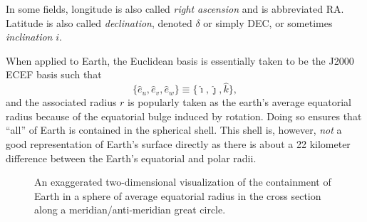 \documentclass[11pt,dvipsnames]{thesis}
\begin{document}
In some fields, longitude is also called \textit{right ascension} and is abbreviated RA. Latitude is also called \textit{declination}, denoted $\delta$ or simply DEC, or sometimes \textit{inclination} $i$.

When applied to Earth, the Euclidean basis is essentially taken to be the J2000 ECEF basis such that
\begin{equation}
\{\hat{e}_u, \hat{e}_v, \hat{e}_w\} \equiv \{\hat{\imath}, \hat{\jmath}, \hat{k}\},
\end{equation}
and the associated radius $r$ is popularly taken as the earth's average equatorial radius because of the equatorial bulge induced by rotation. Doing so ensures that ``all'' of Earth is contained in the spherical shell. This shell is, however, \textit{not} a good representation of Earth's surface directly as there is about a 22 kilometer difference between the Earth's equatorial and polar radii.
\begin{figure}[H]
\centering
{}
\caption{An exaggerated two-dimensional visualization of the containment of Earth in a sphere of average equatorial radius in the cross section along a meridian/anti-meridian great circle.}
\end{figure}


\end{document}
